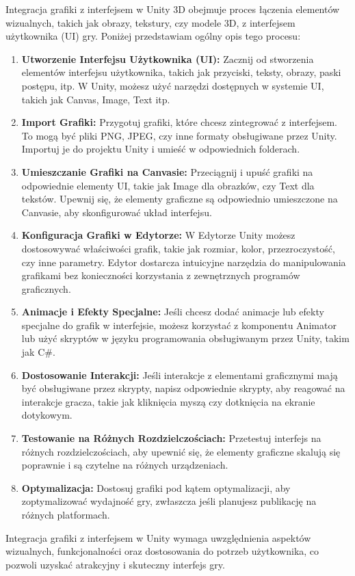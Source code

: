Integracja grafiki z interfejsem w Unity 3D obejmuje proces łączenia elementów wizualnych, takich jak obrazy, tekstury, czy modele 3D, z interfejsem użytkownika (UI) gry. Poniżej przedstawiam ogólny opis tego procesu:

\begin{enumerate}
  \item  \textbf{Utworzenie Interfejsu Użytkownika (UI):} Zacznij od stworzenia elementów interfejsu użytkownika, takich jak przyciski, teksty, obrazy, paski postępu, itp. W Unity, możesz użyć narzędzi dostępnych w systemie UI, takich jak Canvas, Image, Text itp.
  
  \item \textbf{Import Grafiki:} Przygotuj grafiki, które chcesz zintegrować z interfejsem. To mogą być pliki PNG, JPEG, czy inne formaty obsługiwane przez Unity. Importuj je do projektu Unity i umieść w odpowiednich folderach.
  
  \item \textbf{Umieszczanie Grafiki na Canvasie:} Przeciągnij i upuść grafiki na odpowiednie elementy UI, takie jak Image dla obrazków, czy Text dla tekstów. Upewnij się, że elementy graficzne są odpowiednio umieszczone na Canvasie, aby skonfigurować układ interfejsu.
  
  \item \textbf{Konfiguracja Grafiki w Edytorze:} W Edytorze Unity możesz dostosowywać właściwości grafik, takie jak rozmiar, kolor, przezroczystość, czy inne parametry. Edytor dostarcza intuicyjne narzędzia do manipulowania grafikami bez konieczności korzystania z zewnętrznych programów graficznych.
  
  \item \textbf{Animacje i Efekty Specjalne:} Jeśli chcesz dodać animacje lub efekty specjalne do grafik w interfejsie, możesz korzystać z komponentu Animator lub użyć skryptów w języku programowania obsługiwanym przez Unity, takim jak C\#.
  
  \item \textbf{Dostosowanie Interakcji:} Jeśli interakcje z elementami graficznymi mają być obsługiwane przez skrypty, napisz odpowiednie skrypty, aby reagować na interakcje gracza, takie jak kliknięcia myszą czy dotknięcia na ekranie dotykowym.
  
  \item \textbf{Testowanie na Różnych Rozdzielczościach:} Przetestuj interfejs na różnych rozdzielczościach, aby upewnić się, że elementy graficzne skalują się poprawnie i są czytelne na różnych urządzeniach.
  
  \item \textbf{Optymalizacja:} Dostosuj grafiki pod kątem optymalizacji, aby zoptymalizować wydajność gry, zwłaszcza jeśli planujesz publikację na różnych platformach.

\end{enumerate}

Integracja grafiki z interfejsem w Unity wymaga uwzględnienia aspektów wizualnych, funkcjonalności oraz dostosowania do potrzeb użytkownika, co pozwoli uzyskać atrakcyjny i skuteczny interfejs gry.